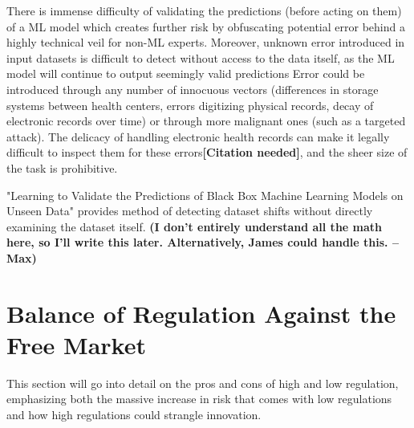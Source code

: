 \documentclass[]{article}
\begin{document}
		There is immense difficulty of validating the predictions (before acting on them) of a ML model which creates further risk by obfuscating potential error behind a highly technical veil for non-ML experts. Moreover, unknown error introduced in input datasets is difficult to detect without access to the data itself, as the ML model will continue to output seemingly valid predictions\cite{10.1145/3328519.3329126} Error could be introduced through any number of innocuous vectors (differences in storage systems between health centers, errors digitizing physical records, decay of electronic records over time) or through more malignant ones (such as a targeted attack). The delicacy of handling electronic health records can make it legally difficult to inspect them for these errors\textbf{[Citation needed]}, and the sheer size of the task is prohibitive.

		"Learning to Validate the Predictions of Black Box Machine Learning Models on Unseen Data"\cite{10.1145/3328519.3329126} provides method of detecting dataset shifts without directly examining the dataset itself. \textbf{(I don't entirely understand all the math here, so I'll write this later. Alternatively, James could handle this. --Max)}

	\section{Balance of Regulation Against the Free Market}
		This section will go into detail on the pros and cons of high and low regulation, emphasizing both the massive increase in risk that comes with low regulations and how high regulations could strangle innovation.

\medskip



		
\end{document}
